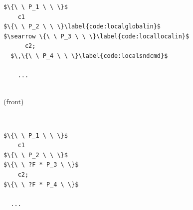 \documentclass[acmsmall,screen]{acmart}  %
\providecommand{\DIFaddbeginFL}{} %
\providecommand{\DIFaddendFL}{} %
\providecommand{\DIFdelbeginFL}{} %
\providecommand{\DIFdelendFL}{} %
\newcommand{\DIFscaledelfig}{0.5}
\newlength{\DIFdelgraphicswidth} %
\newlength{\DIFdelgraphicsheight} %
\newcommand{\DIFaddincludegraphics}[2][]{{\color{blue}\fbox{\DIFOincludegraphics[#1]{#2}}}} %
\newcommand{\DIFdelincludegraphics}[2][]{%
\sbox{\DIFdelgraphicsbox}{\DIFOincludegraphics[#1]{#2}}%
\settoboxwidth{\DIFdelgraphicswidth}{\DIFdelgraphicsbox} %
\settoboxtotalheight{\DIFdelgraphicsheight}{\DIFdelgraphicsbox} %
\scalebox{\DIFscaledelfig}{%
\parbox[b]{\DIFdelgraphicswidth}{\usebox{\DIFdelgraphicsbox}\\[-\baselineskip] \rule{\DIFdelgraphicswidth}{0em}}\llap{\resizebox{\DIFdelgraphicswidth}{\DIFdelgraphicsheight}{%
\setlength{\unitlength}{\DIFdelgraphicswidth}%
\begin{picture}(1,1)%
\thicklines\linethickness{2pt} %
{\color[rgb]{1,0,0}\put(0,0){\framebox(1,1){}}}%
{\color[rgb]{1,0,0}\put(0,0){\line( 1,1){1}}}%
{\color[rgb]{1,0,0}\put(0,1){\line(1,-1){1}}}%
\end{picture}%
}\hspace*{3pt}}} %
} %
\DeclareRobustCommand{\DIFaddbeginFL}{\DIFOaddbeginFL \let\includegraphics\DIFaddincludegraphics} %
\DeclareRobustCommand{\DIFaddendFL}{\DIFOaddendFL \let\includegraphics\DIFOincludegraphics} %
\DeclareRobustCommand{\DIFdelbeginFL}{\DIFOdelbeginFL \let\includegraphics\DIFdelincludegraphics} %
\DeclareRobustCommand{\DIFdelendFL}{\DIFOaddendFL \let\includegraphics\DIFOincludegraphics} %
\begin{document}
\begin{figure}
\begin{minipage}{.15\textwidth}
\DIFdelbeginFL %


\DIFdelendFL \DIFaddbeginFL \begin{lstlisting}[basicstyle=\linespread{0.8}\normalfont\footnotesize\tt]
$\{\ \ P_1 \ \ \}$
    c1
$\{\ \ P_2 \ \ \}\label{code:localglobalin}$
$\searrow \{\ \ P_3 \ \ \}\label{code:locallocalin}$
      c2;
  $\,\{\ \ P_4 \ \ \}\label{code:localsndcmd}$

    ...


\end{lstlisting}
\DIFaddendFL \centerline{\footnotesize(front)}
\end{minipage} \vline ~
\begin{minipage}{.15\textwidth}
\DIFdelbeginFL %


\DIFdelendFL \DIFaddbeginFL \begin{lstlisting}[numbers=none, basicstyle=\linespread{0.8}\normalfont\footnotesize\tt]
$\{\ \ P_1 \ \ \}$
    c1
$\{\ \ P_2 \ \ \}$
$\{\ \ ?F * P_3 \ \}$
    c2;
$\{\ \ ?F * P_4 \ \}$

  ...



\end{lstlisting}
\end{minipage}
\end{figure}
\end{document}
